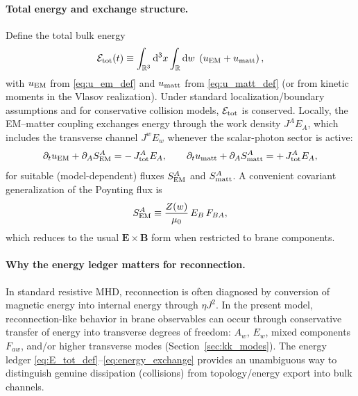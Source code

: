 \documentclass[11pt]{article}
\newcommand{\R}{\mathbb{R}}
\newcommand{\F}{F}              %
\newcommand{\Z}{Z}              %
\newcommand{\E}{\mathbf{E}}
\newcommand{\B}{\mathbf{B}}
\newcommand{\muzero}{\mu_0}
\begin{document}
\paragraph{Total energy and exchange structure.}
Define the total bulk energy
\begin{equation}
\mathcal{E}_{\rm tot}(t)
\equiv
\int_{\R^3}\dd^3x\int_{\R}\dd w\;
\left(
u_{\rm EM} + u_{\rm matt}
\right),
\label{eq:E_tot_def}
\end{equation}
with \(u_{\rm EM}\) from \eqref{eq:u_em_def} and \(u_{\rm matt}\) from
\eqref{eq:u_matt_def} (or from kinetic moments in the Vlasov realization).
Under standard localization/boundary assumptions and for conservative collision
models, \(\mathcal{E}_{\rm tot}\) is conserved. Locally, the EM--matter coupling
exchanges energy through the work density \(J^A E_A\), which includes the transverse
channel \(J^w E_w\) whenever the scalar-photon sector is active:
\begin{equation}
\partial_t u_{\rm EM} + \partial_A S_{\rm EM}^A
=
-\,J_{\rm tot}^A E_A,
\qquad
\partial_t u_{\rm matt} + \partial_A S_{\rm matt}^A
=
+\,J_{\rm tot}^A E_A,
\label{eq:energy_exchange}
\end{equation}
for suitable (model-dependent) fluxes \(S_{\rm EM}^A\) and \(S_{\rm matt}^A\).
A convenient covariant generalization of the Poynting flux is
\begin{equation}
S_{\rm EM}^A \equiv \frac{\Z(w)}{\muzero}\,E_B\,\F_{BA},
\label{eq:poynting_4d}
\end{equation}
which reduces to the usual \(\E\times\B\) form when restricted to brane components.

\paragraph{Why the energy ledger matters for reconnection.}
In standard resistive MHD, reconnection is often diagnosed by conversion of magnetic
energy into internal energy through \(\eta J^2\). In the present model, reconnection-like
behavior in brane observables can occur through conservative transfer of energy into
transverse degrees of freedom: \(A_w\), \(E_w\), mixed components \(\F_{aw}\), and/or
higher transverse modes (Section~\ref{sec:kk_modes}). The energy ledger
\eqref{eq:E_tot_def}--\eqref{eq:energy_exchange} provides an unambiguous way to
distinguish genuine dissipation (collisions) from topology/energy export into bulk
channels.

\end{document}
